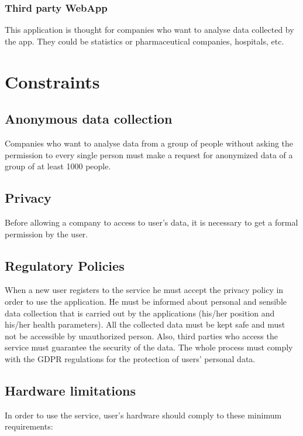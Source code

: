 \subsubsection{Third party WebApp}
This application is thought for companies who want to analyse data collected by the app. They could be statistics or pharmaceutical companies, hospitals, etc.

\section{Constraints}

\subsection{Anonymous data collection}
Companies who want to analyse data from a group of people without asking the permission to every single person must make a request for anonymized data of a group of at least 1000 people.

\subsection{Privacy}
Before allowing a company to access to user’s data, it is necessary to get a formal permission by the user.

\subsection{Regulatory Policies}
When a new user registers to the service he must accept the privacy policy in order to use the application.
He must be informed about personal and sensible data collection that is carried out by the applications (his/her position and his/her health parameters).
All the collected data must be kept safe and must not be accessible by unauthorized person.
Also, third parties who access the service must guarantee the security of the data.
The whole process must comply with the GDPR regulations for the protection of users' personal data.
\clearpage

\subsection{Hardware limitations}\label{hardwareLimitation}
In order to use the service, user’s hardware should comply to these minimum requirements:
